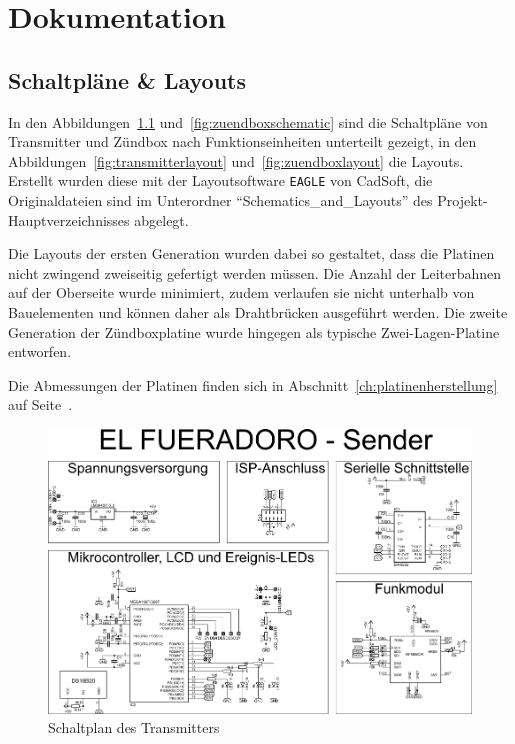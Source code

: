 \documentclass[paper=a4, parskip, numbers=noenddot, toc=listof, headsepline]{scrbook}
\begin{document}
	\part{Dokumentation}
		\label{part:dokumentation}

		\chapter{Schaltpläne \& Layouts}

			In den Abbildungen~\ref{fig:transmitterschematic} und~\ref{fig:zuendboxschematic} sind die Schaltpläne von Transmitter und Zündbox nach Funk\-tions\-ein\-heiten unterteilt gezeigt, in den Abbildungen~\ref{fig:transmitterlayout} und~\ref{fig:zuendboxlayout} die Layouts. Erstellt wurden diese mit der Layoutsoftware \texttt{EAGLE} von CadSoft, die Originaldateien sind im Unterordner \enquote{Schematics\_and\_Layouts} des Projekt-Hauptverzeichnisses abgelegt.

			Die Layouts der ersten Generation wurden dabei so gestaltet, dass die Platinen nicht zwingend zweiseitig gefertigt werden müssen. Die Anzahl der Leiterbahnen auf der Oberseite wurde minimiert, zudem verlaufen sie nicht unterhalb von Bauelementen und können daher als Drahtbrücken ausgeführt werden. Die zweite Generation der Zündboxplatine wurde hingegen als typische Zwei-Lagen-Platine entworfen.

			Die Abmessungen der Platinen finden sich in Abschnitt~\ref{ch:platinenherstellung} auf Seite~\pageref{ch:platinenherstellung}.

			\begin{figure}
				\centering
				\includegraphics[angle=-90, width=.9\textwidth, keepaspectratio]{Bilder/Transmitterschaltplan}
				\caption{Schaltplan des Transmitters}
				\label{fig:transmitterschematic}
			\end{figure}
\end{document}
